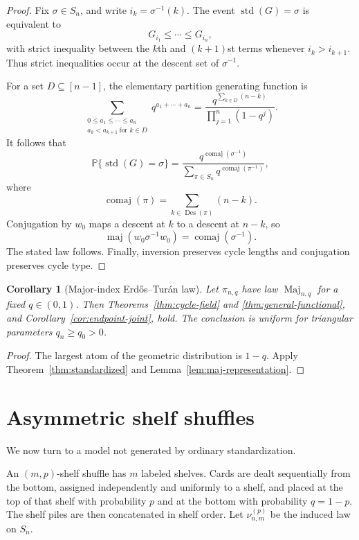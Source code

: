 \documentclass[11pt]{article}
\newtheorem{corollary}[theorem]{Corollary}
\theoremstyle{definition}
\theoremstyle{remark}
\newcommand{\Pp}{\mathbb P}
\begin{document}
\begin{proof}
Fix $\sigma\in S_n$, and write $i_k=\sigma^{-1}(k)$.  The event
$\operatorname{std}(G)=\sigma$ is equivalent to
\[
 G_{i_1}\le\cdots\le G_{i_n},
\]
with strict inequality between the $k$th and $(k+1)$st terms whenever
$i_k>i_{k+1}$.  Thus strict inequalities occur at the descent set of
$\sigma^{-1}$.

For a set $D\subseteq[n-1]$, the elementary partition generating function
is
\[
 \sum_{\substack{0\le a_1\le\cdots\le a_n\\
                  a_k<a_{k+1}\ \text{for }k\in D}}
 q^{a_1+\cdots+a_n}
 =
 \frac{q^{\sum_{k\in D}(n-k)}}{\prod_{j=1}^n(1-q^j)}.
\]
It follows that
\[
 \Pp\{\operatorname{std}(G)=\sigma\}
 =
 \frac{q^{\operatorname{comaj}(\sigma^{-1})}}
      {\sum_{\pi\in S_n}q^{\operatorname{comaj}(\pi^{-1})}},
\]
where
\[
 \operatorname{comaj}(\pi)
 =
 \sum_{k\in\operatorname{Des}(\pi)}(n-k).
\]
Conjugation by $w_0$ maps a descent at $k$ to a descent at $n-k$, so
\[
 \operatorname{maj}(w_0\sigma^{-1}w_0)
 =
 \operatorname{comaj}(\sigma^{-1}).
\]
The stated law follows.  Finally, inversion preserves cycle lengths and
conjugation preserves cycle type.
\end{proof}

\begin{corollary}[Major-index Erd\H{o}s--Tur\'an law]
\label{cor:maj}
Let $\pi_{n,q}$ have law $\operatorname{Maj}_{n,q}$ for a fixed
$q\in(0,1)$.  Then Theorems~\ref{thm:cycle-field} and
\ref{thm:general-functional}, and Corollary~\ref{cor:endpoint-joint}, hold.
The conclusion is uniform for triangular parameters $q_n\ge q_0>0$.
\end{corollary}

\begin{proof}
The largest atom of the geometric distribution is $1-q$.  Apply
Theorem~\ref{thm:standardized} and
Lemma~\ref{lem:maj-representation}.
\end{proof}

\section{Asymmetric shelf shuffles}

We now turn to a model not generated by ordinary standardization.

An $(m,p)$-shelf shuffle has $m$ labeled shelves.  Cards are dealt
sequentially from the bottom, assigned independently and uniformly to a
shelf, and placed at the top of that shelf with probability $p$ and at the
bottom with probability $q=1-p$.  The shelf piles are then concatenated in
shelf order.  Let $\nu_{n,m}^{(p)}$ be the induced law on $S_n$.
\end{document}

